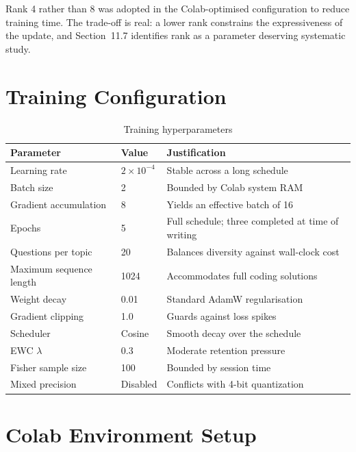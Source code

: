 \documentclass[12pt,a4paper]{report}
\begin{document}
Rank 4 rather than 8 was adopted in the Colab-optimised configuration to reduce training time. The trade-off is real: a lower rank constrains the expressiveness of the update, and Section~11.7 identifies rank as a parameter deserving systematic study.

\section{Training Configuration}

\begin{table}[htbp]
\centering
\caption{Training hyperparameters}
\begin{tabular}{>{\raggedright\arraybackslash}p{4cm} p{3cm} p{5cm}}
\toprule
\textbf{Parameter} & \textbf{Value} & \textbf{Justification} \\
\midrule
Learning rate & $2 \times 10^{-4}$ & Stable across a long schedule \\
Batch size & 2 & Bounded by Colab system RAM \\
Gradient accumulation & 8 & Yields an effective batch of 16 \\
Epochs & 5 & Full schedule; three completed at time of writing \\
Questions per topic & 20 & Balances diversity against wall-clock cost \\
Maximum sequence length & 1024 & Accommodates full coding solutions \\
Weight decay & 0.01 & Standard AdamW regularisation \\
Gradient clipping & 1.0 & Guards against loss spikes \\
Scheduler & Cosine & Smooth decay over the schedule \\
EWC $\lambda$ & 0.3 & Moderate retention pressure \\
Fisher sample size & 100 & Bounded by session time \\
Mixed precision & Disabled & Conflicts with 4-bit quantization \\
\bottomrule
\end{tabular}
\end{table}

\section{Colab Environment Setup}
\end{document}
